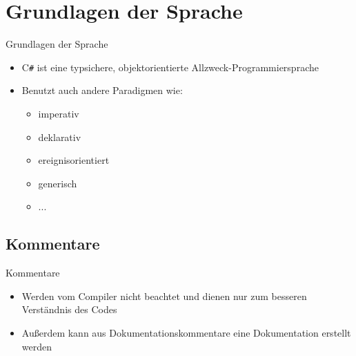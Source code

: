 \section{Grundlagen der Sprache}
\begin{frame}{Grundlagen der Sprache}
	\begin{itemize}
		\item C\texttt{\#} ist eine typsichere, objektorientierte Allzweck-Programmiersprache	
		\item Benutzt auch andere Paradigmen wie:
		\begin{itemize}
			\item imperativ
			\item deklarativ
			\item ereignisorientiert
			\item generisch
			\item ...
		\end{itemize}
	\end{itemize}	
\end{frame}

\subsection{Kommentare}
\begin{frame}{Kommentare}
	\begin{itemize}
		\item Werden vom Compiler nicht beachtet und dienen nur zum besseren Verständnis des Codes
		\item Außerdem kann aus Dokumentationskommentare eine Dokumentation erstellt werden
	\end{itemize}
	
\end{frame}

